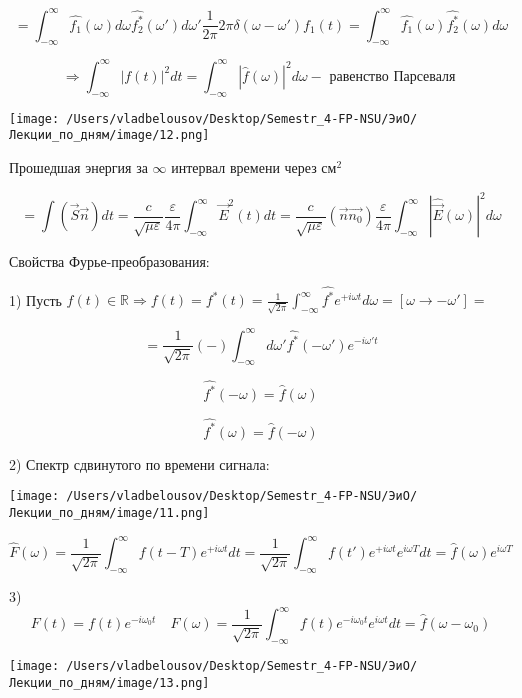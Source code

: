 \documentclass[12pt, a4paper]{report}
\begin{document}
\[ = \int_{-\infty}^{\infty}    \hat{f_1} (\omega)d \omega \hat{f_2 ^{*} }(\omega') d \omega' \frac{1}{2 \pi} 2\pi \delta ( \omega -\omega') f_1(t)= \int_{-\infty }^{\infty}\hat{f_1 }(\omega) \hat{f_2 ^{*} }(\omega) d \omega  \]

\[ \Rightarrow \int_{-\infty}^{\infty} |f(t)| ^2 dt = \int  _{-\infty}^{\infty} |\hat{f}(\omega)| ^2 d \omega - \text{ равенство Парсеваля }   \] 

\begin{center}
    \texttt{[image: /Users/vladbelousov/Desktop/Semestr\_4-FP-NSU/ЭиО/Лекции\_по\_дням/image/12.png]}
\end{center}

Прошедшая энергия за \( \infty \)  интервал времени через см\( ^2 \)

\[ = \int (\vec{S}\vec{n})dt= \frac{c}{\sqrt{\mu \varepsilon}} \frac{\varepsilon}{ 4\pi }  \int_{-\infty}^{\infty} \vec{E} ^2(t)dt = \frac{c}{\sqrt{\mu \varepsilon}} ( \vec{n}\vec{n_0}) \frac{\varepsilon}{4 \pi} \int_{-\infty}^{\infty} |\hat{\vec{E}}(\omega) | ^2 d \omega  \] 

Свойства Фурье-преобразования: 

1) Пусть \( \displaystyle f(t) \in  \mathbb{R} \Rightarrow f(t)= f^*(t)= \frac{1}{\sqrt{2\pi}}\int_{-\infty}^{\infty} \hat{f^{*} }e ^{+i \omega t} d \omega =[\omega \to  - \omega ']   =  \)

\[ =\frac{1}{\sqrt{ 2 \pi }}(- )\int_{-\infty}^{\infty} d \omega ' \hat{f^{*} } ( -\omega ')e^{- i \omega' t}     \] 

\[ \hat{f^*} (- \omega) = \hat{f}(\omega)  \]

\[ \hat{f^*} ( \omega) = \hat{f}(-\omega) \] 


2) Спектр сдвинутого по времени сигнала:

\begin{center}
    \texttt{[image: /Users/vladbelousov/Desktop/Semestr\_4-FP-NSU/ЭиО/Лекции\_по\_дням/image/11.png]}
\end{center}
\[  \hat{F}(\omega)=\frac{1}{\sqrt{2 \pi}}\int_{-\infty}^{\infty} f(t- T)e^{+ i \omega t }dt = \frac{1}{\sqrt{2\pi}} \int_{-\infty}^{\infty} f(t' )e^{+ i \omega t } e^{i \omega T} dt =\hat{f}(\omega)e^{i \omega T}         \]  

3) \[  F( t)= f(t) e^{- i \omega_0 t  }\quad  F(\omega)= \frac{1}{\sqrt{2 \pi}} \int_{-\infty}^{\infty}   f(t) e ^{- i \omega_0 t} e ^{i \omega t}dt  = \hat{f}( \omega - \omega_0) \]  

\begin{center}
    \texttt{[image: /Users/vladbelousov/Desktop/Semestr\_4-FP-NSU/ЭиО/Лекции\_по\_дням/image/13.png]}
\end{center}
\end{document}
